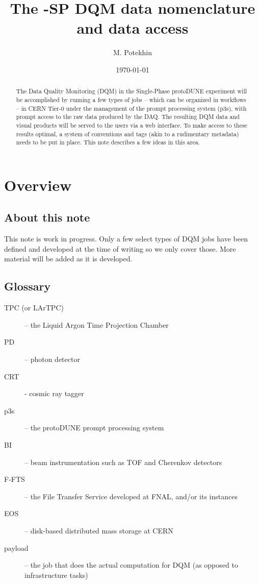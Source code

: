 \documentclass[pdftex,12pt,letter]{article}
\title{The \pd-SP DQM data nomenclature and data access}
\date{\today}
\author{M. Potekhin}
\newcommand{\pd}{protoDUNE\xspace}
\begin{document}
\maketitle

\begin{abstract}
\noindent  The Data Quality Monitoring (DQM) in the Single-Phase \pd experiment will be accomplished by running a few types
of jobs -- which can be organized in workflows -- in CERN Tier-0 under the management of the prompt processing system (p3s),
with prompt access to the raw data produced by the DAQ.
The resulting DQM data and visual products will be served to the users via a web interface. To make access to these results
optimal, a system of conventions and tags (akin to a rudimentary metadata) needs to be put in place. This
note describes a few ideas in this area.
\end{abstract}

\section{Overview}
\subsection{About this note}
This note is work in progress. Only a few select types of DQM jobs have been defined and developed at the time of writing
so we only cover those. More material will be added as it is developed.

\subsection{Glossary}
\begin{description}
\item [TPC (or LArTPC)] -- the Liquid Argon Time Projection Chamber
\item [PD] -- photon detector
\item [CRT] - cosmic ray tagger
\item [p3s] -- the \pd prompt processing system
\item [BI] -- beam instrumentation such as TOF and Cherenkov detectors
\item [F-FTS] -- the File Transfer Service developed at FNAL, and/or its instances
\item [EOS] -- disk-based distributed mass storage at CERN
\item [payload] -- the job that does the actual computation for DQM (as opposed to infrastructure tasks)
\end{description}
\end{document}

